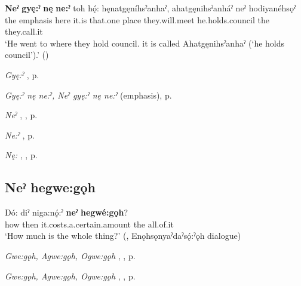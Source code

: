 \ea
\label{ex:npar31}
\gll \textbf{Neˀ} \textbf{gyę:ˀ} \textbf{nę} \textbf{ne:ˀ} toh hǫ́: hęnatgęníhsˀanhaˀ, ahatgęnihsˀanháˀ neˀ hodiyanéhsǫˀ\\
the emphasis here it.is that.one place they.will.meet he.holds.council the they.call.it\\
\glt ‘He went to where they hold council. it is called Ahatgęnihsˀanhaˀ (`he holds council’).’ (\cite{henry_de_2005})
\z

\begin{CayugaRelated}
\item \textit{Gyę:ˀ} , p. \pageref{p:[gyę:ˀ]}\\
\item \textit{Gyę:ˀ nę ne:ˀ, Neˀ gyę:ˀ nę ne:ˀ} (emphasis), p. \pageref{p:[gyę:ˀ nę ne:ˀ]}\\
\item \textit{Neˀ} , , p. \pageref{p:[neˀ]}\\
\item \textit{Ne:ˀ} , p. \pageref{p:[ne:ˀ] `it is’}\\
\item \textit{Nę:} , , p. \pageref{p:[nę:] ‘this, these’}
\end{CayugaRelated}


\subsection*{\textbf{Neˀ hegwe:gǫh} } \label{p:[neˀ hegwe:gǫh]}

\ea
\label{ex:hpar10}
\gll Dó: diˀ niga:nǫ́:ˀ \textbf{neˀ} \textbf{hegwé:gǫh}?\\
how then it.costs.a.certain.amount the all.of.it\\
\glt ‘How much is the whole thing?’ (\cite[159]{mithun_watewayestanih_1984}, Enǫhsǫnyaˀdaˀsǫ́:ˀǫh dialogue)
\z

\begin{CayugaRelated}
\item \textit{Gwe:gǫh, Agwe:gǫh, Ogwe:gǫh} , , p. \pageref{p:[gwe:gǫh] ‘all’}\\
\item \textit{Gwe:gǫh, Agwe:gǫh, Ogwe:gǫh} , , p. \pageref{p:[gwe:gǫh] ‘totally’}
\end{CayugaRelated}


